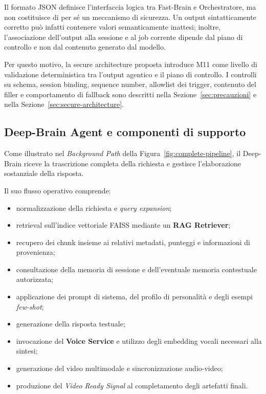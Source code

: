 \documentclass[11pt,a4paper]{article}
\begin{document}
Il formato JSON definisce l'interfaccia logica tra Fast-Brain e
Orchestratore, ma non costituisce di per sé un meccanismo di sicurezza.
Un output sintatticamente corretto può infatti contenere valori
semanticamente inattesi; inoltre, l'associazione dell'output alla
sessione e al job corrente dipende dal piano di controllo e non dal
contenuto generato dal modello.

Per questo motivo, la secure architecture proposta introduce M11 come
livello di validazione deterministica tra l'output agentico e il piano
di controllo. I controlli su schema, session binding, sequence number,
allowlist dei trigger, contenuto del filler e comportamento di fallback
sono descritti nella Sezione~\ref{sec:precauzioni} e nella
Sezione~\ref{sec:secure-architecture}.

\subsection{Deep-Brain Agent e componenti di supporto}

Come illustrato nel \emph{Background Path} della
Figura~\ref{fig:complete-pipeline}, il Deep-Brain riceve la trascrizione
completa della richiesta e gestisce l'elaborazione sostanziale della
risposta.

Il suo flusso operativo comprende:

\begin{itemize}

    \item normalizzazione della richiesta e \emph{query expansion};
    \item retrieval sull'indice vettoriale FAISS mediante un
    \textbf{RAG Retriever};
    \item recupero dei chunk insieme ai relativi metadati, punteggi e
    informazioni di provenienza;
    \item consultazione della memoria di sessione e dell'eventuale
    memoria contestuale autorizzata;
    \item applicazione dei prompt di sistema, del profilo di personalità
    e degli esempi \emph{few-shot};
    \item generazione della risposta testuale;
    \item invocazione del \textbf{Voice Service} e utilizzo degli
    embedding vocali necessari alla sintesi;
    \item generazione del video multimodale e sincronizzazione
    audio-video;
    \item produzione del \emph{Video Ready Signal} al completamento
    degli artefatti finali.

\end{itemize}
\end{document}
